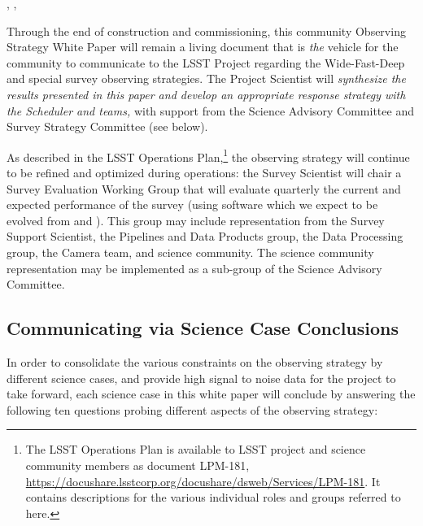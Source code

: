 , , 

Through the end of construction and commissioning, this community
Observing Strategy White Paper will remain a living document that is
{\it the} vehicle for the community to communicate to the LSST Project
regarding the Wide-Fast-Deep and special survey observing strategies.
The Project Scientist will {\it synthesize the results presented in this paper
and develop an appropriate response strategy with the Scheduler and \OpSim
teams,} with support from the Science Advisory Committee and Survey Strategy Committee (see below).

As described in the LSST Operations Plan,\footnote{The LSST Operations Plan is available to LSST project and science community members as document LPM-181, \url{https://docushare.lsstcorp.org/docushare/dsweb/Services/LPM-181}. It contains descriptions for the various individual roles and groups referred to here.} the observing
strategy will continue to be refined and optimized during operations:
the Survey Scientist will chair a Survey Evaluation Working Group that
will evaluate quarterly the current and expected performance of the
survey (using software which we expect to be evolved from \OpSim and \MAF).
This group may include representation
from the Survey Support Scientist, the Pipelines and Data Products
group, the Data Processing group, the Camera team, and science
community.  The science community representation may be implemented as a
sub-group of the Science Advisory Committee.


\subsection{Communicating via Science Case Conclusions}
\def\secname{intro:evaluation:caseConclusions}\label{sec:\secname}


In order to consolidate the various constraints on the observing
strategy by different science cases, and provide high signal to noise
data for the project to take forward, each science case in this white paper will conclude by answering the following ten
questions probing different aspects of the observing strategy:

